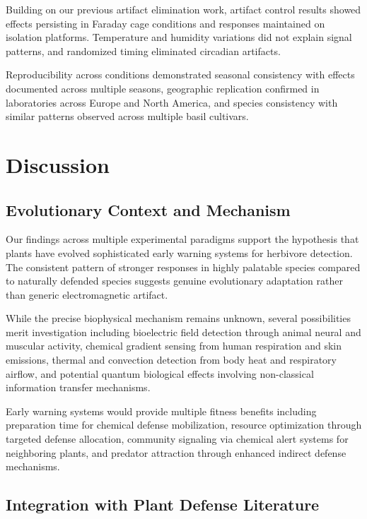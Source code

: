 \documentclass{article}
\begin{document}
Building on our previous artifact elimination work, artifact control results showed effects persisting in Faraday cage conditions and responses maintained on isolation platforms. Temperature and humidity variations did not explain signal patterns, and randomized timing eliminated circadian artifacts.

Reproducibility across conditions demonstrated seasonal consistency with effects documented across multiple seasons, geographic replication confirmed in laboratories across Europe and North America, and species consistency with similar patterns observed across multiple basil cultivars.

\section{Discussion}

\subsection{Evolutionary Context and Mechanism}

Our findings across multiple experimental paradigms support the hypothesis that plants have evolved sophisticated early warning systems for herbivore detection. The consistent pattern of stronger responses in highly palatable species compared to naturally defended species suggests genuine evolutionary adaptation rather than generic electromagnetic artifact.

While the precise biophysical mechanism remains unknown, several possibilities merit investigation including bioelectric field detection through animal neural and muscular activity, chemical gradient sensing from human respiration and skin emissions, thermal and convection detection from body heat and respiratory airflow, and potential quantum biological effects involving non-classical information transfer mechanisms.

Early warning systems would provide multiple fitness benefits including preparation time for chemical defense mobilization, resource optimization through targeted defense allocation, community signaling via chemical alert systems for neighboring plants, and predator attraction through enhanced indirect defense mechanisms.

\subsection{Integration with Plant Defense Literature}
\end{document}
